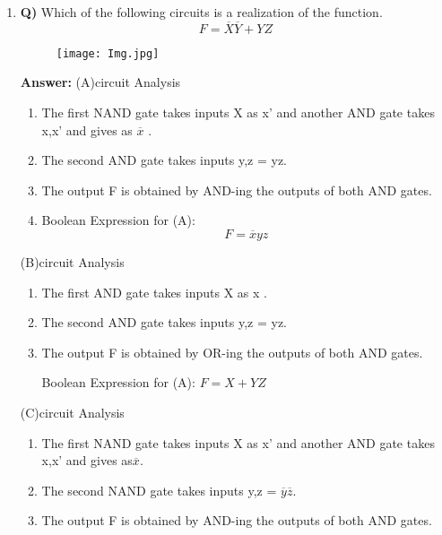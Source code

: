 \documentclass[12pt]{article}
\begin{document}
\begin{enumerate}
\item{\bfseries Q)}
 Which of the following circuits is a realization of the function.\[
F = \overline{X} \overline{Y} + YZ
\]

\begin{figure}[!h]
\centering
  \texttt{[image: Img.jpg]}
\end{figure}

{\bfseries Answer:}
(A)circuit Analysis\\
\begin{enumerate}
\item The first NAND gate takes inputs X as x' and another AND gate takes x,x' and gives as \(\overline{x}\) .\\

\item The second AND gate takes inputs y,z = yz.\\

\item The output F is obtained by AND-ing the outputs of both AND gates.\\

\item Boolean Expression for (A):\\
\[
F = \overline{x}yz
\]
\end{enumerate}
(B)circuit Analysis\\
\begin{enumerate}
\item The first AND gate takes inputs X as x .

\item The second AND gate takes inputs y,z = yz.

\item The output F is obtained by OR-ing the outputs of both AND gates.

Boolean Expression for (A):
\(
F =X+YZ
\)\\
\end{enumerate}
(C)circuit Analysis\\
\begin{enumerate}
\item The first NAND gate takes inputs X as x' and another AND gate takes x,x' and gives as\(\overline{x}.\)

\item The second NAND gate takes inputs y,z = \(\overline{y}\overline{z}.\)

\item The output F is obtained by AND-ing the outputs of both AND gates.


\end{enumerate}
\end{enumerate}
\end{document}
